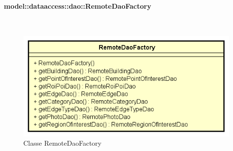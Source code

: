 \documentclass[../DefinizioneDiProdotto.tex]{subfiles}
\begin{document}
\paragraph{model::dataaccess::dao::RemoteDaoFactory}
\
\begin{figure}[H]
	\centering
	\includegraphics[width=\maxwidth]{img/RemoteDaoFactory.png}
	\caption{Classe RemoteDaoFactory}\label{fig:model::dataaccess::dao::RemoteDaoFactory} 
\end{figure}
\end{document}
